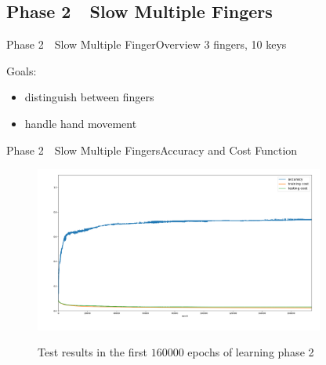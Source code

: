 \subsection{Phase 2~\textendash{}~Slow Multiple Fingers}
\begin{frame}[fragile]{Phase 2~\textendash{}~Slow Multiple Finger}{Overview}
    3 fingers, 10 keys

    \pause
    \vspace{2em}
    Goals:
    \begin{itemize}
        \item distinguish between fingers
        \item handle hand movement
    \end{itemize}
\end{frame}

\begin{frame}[fragile]{Phase 2~\textendash{}~Slow Multiple Fingers}{Accuracy and Cost Function}
    \begin{figure}
        \includegraphics[width=0.85\textwidth]{../common/images/phase-2}
        \label{fig:phase21}
        \caption{Test results in the first $160 000$ epochs of learning phase 2}
    \end{figure}
\end{frame}

